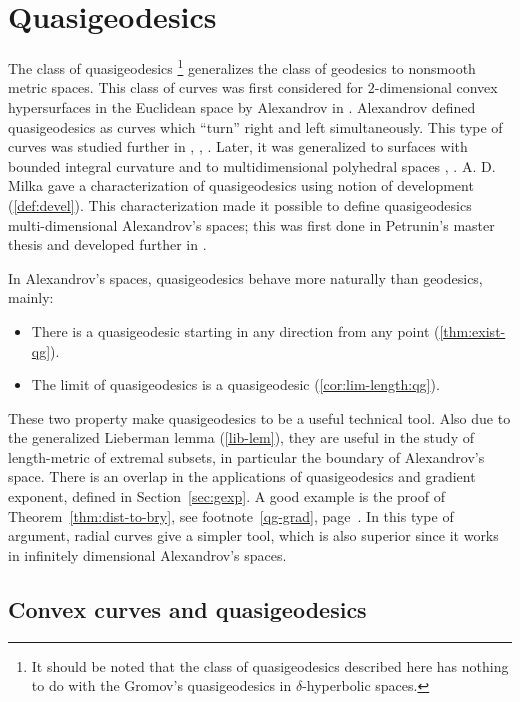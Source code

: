 \chapter{Quasigeodesics %
}\label{chap:qg}



The class of quasigeodesics%
\footnote{It should be noted that the class of quasigeodesics described here 
has nothing to do with the Gromov's quasigeodesics in $\delta$-hyperbolic spaces.} 
generalizes the class of geodesics to nonsmooth metric spaces.
This class of curves was first considered for $2$-dimensional convex hypersurfaces in the Euclidean space
by Alexandrov in \cite{alexandrov:qg}. 
Alexandrov defined quasigeodesics as curves which ``turn'' right and left simultaneously.
This type of curves was studied further in \cite{pogorelov:qg}, \cite{alexandrov-burago},
\cite{milka:qg}.
Later, it was generalized to surfaces with bounded integral
curvature \cite{alexandrov:int-qg} and to multidimensional polyhedral spaces \cite{milka:poly1},
\cite{milka:poly2}.
A. D. Milka gave a characterization of quasigeodesics using notion of development (\ref{def:devel}).
This characterization made it possible to define quasigeodesics multi-dimensional Alexandrov's spaces;
this was first done in Petrunin's master thesis and developed further in \cite{perelman-petrunin:qg}.

In Alexandrov's spaces, quasigeodesics behave more naturally than geodesics, mainly: 
\begin{itemize}
\item There is a quasigeodesic starting in any direction from any point (\ref{thm:exist-qg}).
\item The limit of quasigeodesics is a quasigeodesic (\ref{cor:lim-length:qg}).
\end{itemize}

These two property make quasigeodesics to be a useful technical tool. 
Also due to the generalized Lieberman lemma (\ref{lib-lem}), 
they are useful in the study of length-metric of extremal subsets, 
in particular the boundary of Alexandrov's space. 
There is an overlap in the applications of quasigeodesics and gradient
exponent, defined in Section~\ref{sec:gexp}.
A good example is the proof of
Theorem~\ref{thm:dist-to-bry}, see footnote~\ref{qg-grad},
page~\pageref{qg-grad}.
In this type of argument, radial curves give a simpler tool,
which is also
superior since it works in infinitely dimensional Alexandrov's spaces.

\section{Convex curves and quasigeodesics}


